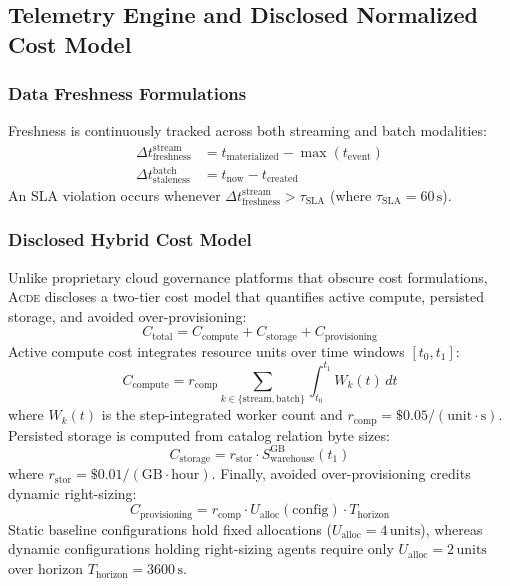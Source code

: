 \subsection{Telemetry Engine and Disclosed Normalized Cost Model}
\label{subsec:telemetry}

\subsubsection{Data Freshness Formulations}
Freshness is continuously tracked across both streaming and batch modalities:
\begin{align}
\Delta t_{\text{freshness}}^{\text{stream}} &= t_{\text{materialized}} - \max(t_{\text{event}}) \label{eq:stream_fresh} \\
\Delta t_{\text{staleness}}^{\text{batch}} &= t_{\text{now}} - t_{\text{created}} \label{eq:batch_fresh}
\end{align}
An SLA violation occurs whenever $\Delta t_{\text{freshness}}^{\text{stream}} > \tau_{\text{SLA}}$ (where $\tau_{\text{SLA}} = 60\,\text{s}$).

\subsubsection{Disclosed Hybrid Cost Model}
Unlike proprietary cloud governance platforms that obscure cost formulations, \textsc{Acde} discloses a two-tier cost model that quantifies active compute, persisted storage, and avoided over-provisioning:
\begin{equation}
C_{\text{total}} = C_{\text{compute}} + C_{\text{storage}} + C_{\text{provisioning}}
\label{eq:cost_total}
\end{equation}
Active compute cost integrates resource units over time windows $[t_0, t_1]$:
\begin{equation}
C_{\text{compute}} = r_{\text{comp}} \sum_{k \in \{\text{stream}, \text{batch}\}} \int_{t_0}^{t_1} W_k(t) \, dt
\end{equation}
where $W_k(t)$ is the step-integrated worker count and $r_{\text{comp}} = \$0.05 / (\text{unit}\cdot\text{s})$. Persisted storage is computed from catalog relation byte sizes:
\begin{equation}
C_{\text{storage}} = r_{\text{stor}} \cdot S_{\text{warehouse}}^{\text{GB}}(t_1)
\end{equation}
where $r_{\text{stor}} = \$0.01 / (\text{GB}\cdot\text{hour})$. Finally, avoided over-provisioning credits dynamic right-sizing:
\begin{equation}
C_{\text{provisioning}} = r_{\text{comp}} \cdot U_{\text{alloc}}(\text{config}) \cdot T_{\text{horizon}}
\end{equation}
Static baseline configurations hold fixed allocations ($U_{\text{alloc}} = 4\,\text{units}$), whereas dynamic configurations holding right-sizing agents require only $U_{\text{alloc}} = 2\,\text{units}$ over horizon $T_{\text{horizon}} = 3600\,\text{s}$.

